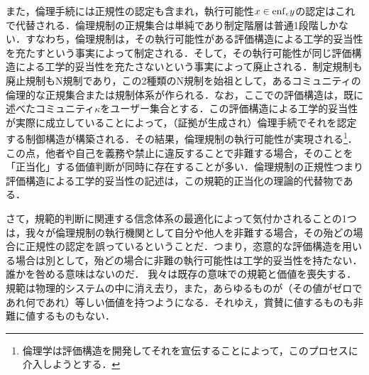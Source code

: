 また，倫理手続には正規性の認定も含まれ，執行可能性$ x\in\mathrm{enf}_{\epsilon}y $の認定はこれで代替される．倫理規制の正規集合は単純であり制定階層は普通1段階しかない．すなわち，倫理規制は，その執行可能性がある評価構造による工学的妥当性を充たすという事実によって制定される．そして，その執行可能性が同じ評価構造による工学的妥当性を充たさないという事実によって廃止される．制定規制も廃止規制もN規制であり，この2種類のN規制を始祖として，あるコミュニティの倫理的な正規集合または規制体系が作られる．なお，ここでの評価構造は，既に述べたコミュニティ$\kappa$をユーザー集合とする．この評価構造による工学的妥当性が実際に成立していることによって，（証拠が生成され）倫理手続でそれを認定する制御構造が構築される．その結果，倫理規制の執行可能性が実現される\footnote{倫理学は評価構造を開発してそれを宣伝することによって，このプロセスに介入しようとする．}．
この点，他者や自己を義務や禁止に違反することで非難する場合，そのことを「正当化」する価値判断が同時に存在することが多い．倫理規制の正規性つまり評価構造による工学的妥当性の記述は，この規範的正当化の理論的代替物である．

さて，規範的判断に関連する信念体系の最適化によって気付かされることの1つは，我々が倫理規制の執行機関として自分や他人を非難する場合，その殆どの場合に正規性の認定を誤っているということだ．つまり，恣意的な評価構造を用いる場合は別として，殆どの場合に非難の執行可能性は工学的妥当性を持たない．誰かを咎める意味はないのだ．
我々は既存の意味での規範と価値を喪失する．規範は物理的システムの中に消え去り，また，あらゆるものが（その値がゼロであれ何であれ）等しい価値を持つようになる．それゆえ，賞賛に値するものも非難に値するものもない．